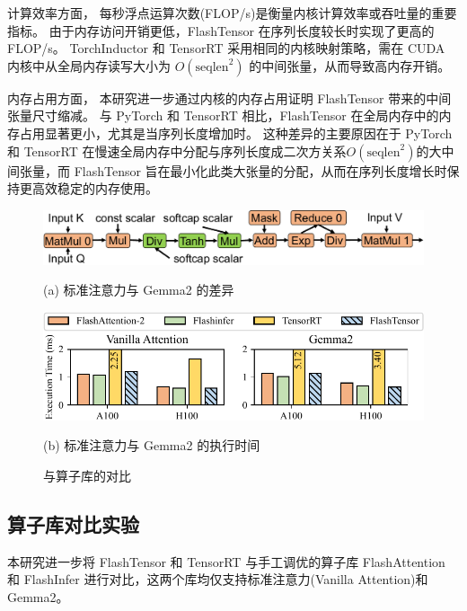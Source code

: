 计算效率方面，
每秒浮点运算次数(FLOP/s)是衡量内核计算效率或吞吐量的重要指标。
由于内存访问开销更低，FlashTensor 在序列长度较长时实现了更高的 FLOP/s。
TorchInductor 和 TensorRT 采用相同的内核映射策略，需在 CUDA 内核中从全局内存读写大小为 $O(\text{seqlen}^2)$ 的中间张量，从而导致高内存开销。  

内存占用方面，
本研究进一步通过内核的内存占用证明 FlashTensor 带来的中间张量尺寸缩减。
与 PyTorch 和 TensorRT 相比，FlashTensor 在全局内存中的内存占用显著更小，尤其是当序列长度增加时。
这种差异的主要原因在于 PyTorch 和 TensorRT 在慢速全局内存中分配与序列长度成二次方关系$O(\text{seqlen}^2)$的大中间张量，而 FlashTensor 旨在最小化此类大张量的分配，从而在序列长度增长时保持更高效稳定的内存使用。  

\begin{figure}[htbp]
    \centering
    \begin{minipage}[t]{\linewidth}
        \centering
        \includegraphics[width=0.75\linewidth]{figures/flashtensor/exp_gemma2-crop.pdf}
    \end{minipage}
    \vspace{-0.5em}
    \caption*{\small (a) 标准注意力与 Gemma2 的差异}
    
    \begin{minipage}[t]{\linewidth}
        \centering
        \includegraphics[width=0.7\linewidth]{figures/flashtensor/attn_time-crop.pdf}
    \end{minipage}
    \vspace{-0.5em}
    \caption*{\small (b) 标准注意力与 Gemma2 的执行时间}
    
    \caption{与算子库的对比}
    \label{fig:lib_cmp}
\end{figure}

\subsection{算子库对比实验}
本研究进一步将 FlashTensor 和 TensorRT 与手工调优的算子库 FlashAttention 和 FlashInfer 进行对比，这两个库均仅支持标准注意力(Vanilla Attention)和 Gemma2。  

